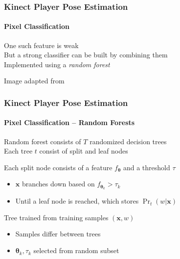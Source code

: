 \documentclass[xetex,professionalfont]{beamer}
\renewcommand{\vec}[1]{\ensuremath{\mathbf{#1}}}
\newcommand{\vx}{\vec{x}}
\newcommand{\bth}{\boldsymbol{\theta}}
\begin{document}

\begin{frame}
\frametitle{Kinect Player Pose Estimation}
\framesubtitle{Pixel Classification}

One such feature is weak\\\medskip
But a strong classifier can be built by combining them\\\medskip 
Implemented using a \emph{random forest} %

\bigskip
\begin{center}
    {\centering Image adapted from \cite{shotton2011}}
\end{center}

\end{frame}


\begin{frame}
\frametitle{Kinect Player Pose Estimation}
\framesubtitle{Pixel Classification -- Random Forests}

Random forest consists of $T$ randomized decision trees\\\medskip
Each tree $t$ consist of split and leaf nodes

\bigskip
Each split node consists of a feature $f_{\bth}$ and a threshold $\tau$
\begin{itemize}
    \item $\vx$ branches down based on $f_{\bth_k}>\tau_k$
    \item Until a leaf node is reached, which stores $\Pr_t(w|\vx)$ %
\end{itemize}

\bigskip
Tree trained from training samples $(\vx,w)$
\begin{itemize}
    \item Samples differ between trees
    \item $\bth_k,\tau_k$ selected from random subset %
\end{itemize}

\end{frame}
\end{document}
